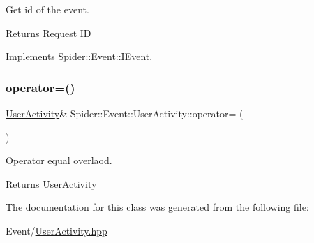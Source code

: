 Get id of the event. 

\begin{DoxyReturn}{Returns}
\hyperlink{class_spider_1_1_event_1_1_request}{Request} ID 
\end{DoxyReturn}


Implements \hyperlink{class_spider_1_1_event_1_1_i_event_a902d1376faa8e5948fa5bfe8d7208c88}{Spider\+::\+Event\+::\+I\+Event}.

\mbox{\label{class_spider_1_1_event_1_1_user_activity_a063f3f10b0ecfa7f084a8047e17bea57}} 
\subsubsection{\texorpdfstring{operator=()}{operator=()}}
{\footnotesize\ttfamily \hyperlink{class_spider_1_1_event_1_1_user_activity}{User\+Activity}\& Spider\+::\+Event\+::\+User\+Activity\+::operator= (\begin{DoxyParamCaption}\item[{const \hyperlink{class_spider_1_1_event_1_1_user_activity}{User\+Activity} \&}]{ }\end{DoxyParamCaption})\hspace{0.3cm}{\ttfamily [delete]}}



Operator equal overlaod. 

\begin{DoxyReturn}{Returns}
\hyperlink{class_spider_1_1_event_1_1_user_activity}{User\+Activity} 
\end{DoxyReturn}


The documentation for this class was generated from the following file\+:\begin{DoxyCompactItemize}
\item 
Event/\hyperlink{_user_activity_8hpp}{User\+Activity.\+hpp}\end{DoxyCompactItemize}
